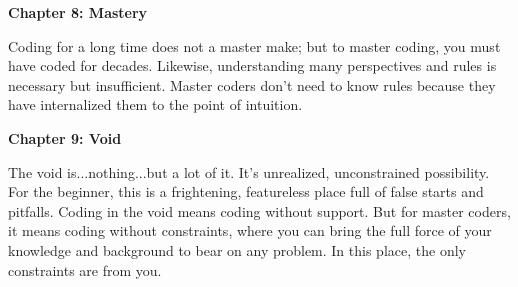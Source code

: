 \textbf{Chapter 8: Mastery}

Coding for a long time does not a master make; but to master coding, you must
have coded for decades. Likewise, understanding many perspectives and rules is
necessary but insufficient. Master coders don't need to know rules because they
have internalized them to the point of intuition.


\textbf{Chapter 9: Void}

The void is...nothing...but a lot of it. It's unrealized, unconstrained
possibility. For the beginner, this is a frightening, featureless place full of
false starts and pitfalls.  Coding in the void means coding without support. But
for master coders, it means coding without constraints, where you can bring the
full force of your knowledge and background to bear on any problem. In this
place, the only constraints are from you.


